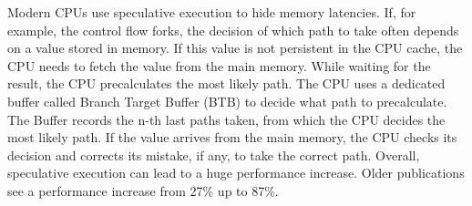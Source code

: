 Modern CPUs use speculative execution to hide memory latencies. If, for example, the control flow forks, the decision of
which path to take often depends on a value stored in memory. If this value is not
persistent in the CPU cache, the CPU needs to fetch the value from the main memory. While waiting for the result, the CPU
precalculates the most likely path. The CPU uses a dedicated buffer called Branch Target Buffer (BTB) to decide what
path to precalculate. The Buffer records the n-th last paths taken, from which the CPU decides the most likely path.
If the value arrives from the main memory, the CPU checks its decision and corrects its mistake, if any, to take the
correct path. Overall, speculative execution can lead to a huge performance increase. Older publications see a
performance increase from 27\% up to 87\%.\cite{espasa1997out, mock2005empirical}

